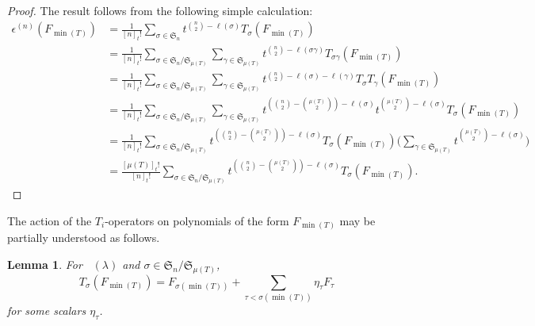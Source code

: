 \documentclass[pdftex]{sigma}
\numberwithin{equation}{section}
\newtheorem{Lemma}[Theorem]{Lemma}
\theoremstyle{definition}
\DeclareMathOperator{\RSSYT}{\mathrm{RSSYT}_{\geq 0}}
\DeclareMathOperator{\Min}{\mathrm{min}}
\begin{document}
\begin{proof}
 The result follows from the following simple calculation:
 \begin{align*}
 \epsilon^{(n)}(F_{\Min(T)}) &
 = \frac{1}{[n]_{t}!}\sum_{\sigma \in \mathfrak{S}_n} t^{{n\choose 2} - \ell(\sigma)} T_{\sigma} (F_{\Min(T)}) \\
 & = \frac{1}{[n]_{t}!}\sum_{\sigma \in \mathfrak{S}_n/\mathfrak{S}_{\mu(T)}} \sum_{\gamma \in \mathfrak{S}_{\mu(T)}} t^{{n\choose 2} - \ell(\sigma\gamma)} T_{\sigma \gamma} (F_{\Min(T)}) \\
 & = \frac{1}{[n]_{t}!}\sum_{\sigma \in \mathfrak{S}_n/\mathfrak{S}_{\mu(T)}} \sum_{\gamma \in \mathfrak{S}_{\mu(T)}} t^{{n\choose 2} - \ell(\sigma) - \ell(\gamma)} T_{\sigma} T_{\gamma} (F_{\Min(T)}) \\
 & = \frac{1}{[n]_{t}!}\sum_{\sigma \in \mathfrak{S}_n/\mathfrak{S}_{\mu(T)}} \sum_{\gamma \in \mathfrak{S}_{\mu(T)}} t^{({n\choose 2}- {\mu(T) \choose 2})- \ell(\sigma)} t^{ {\mu(T) \choose 2} - \ell(\sigma) } T_{\sigma} (F_{\Min(T)}) \\
 & = \frac{1}{[n]_{t}!}\sum_{\sigma \in \mathfrak{S}_n/\mathfrak{S}_{\mu(T)}} t^{({n\choose 2}- {\mu(T) \choose 2})- \ell(\sigma)} T_{\sigma} (F_{\Min(T)}) \biggl( \sum_{\gamma \in \mathfrak{S}_{\mu(T)}}t^{ {\mu(T) \choose 2} - \ell(\sigma) }\biggr) \\
 & = \frac{[\mu(T)]_{t}!}{[n]_{t}!} \sum_{\sigma \in \mathfrak{S}_n/\mathfrak{S}_{\mu(T)}} t^{ ({n \choose 2} - {\mu(T) \choose 2}) - \ell(\sigma)}T_{\sigma}(F_{\Min(T)}).\tag*{\qed}
 \end{align*} \renewcommand{\qed}{}
\end{proof}

The action of the $T_i$-operators on polynomials of the form $F_{\Min(T)}$ may be partially understood as follows.

\begin{Lemma}\label{triangularity for min coset reps}
For $\RSSYT(\lambda)$ and $\sigma \in \mathfrak{S}_n/\mathfrak{S}_{\mu(T)}$,
\[
T_{\sigma}(F_{\Min(T)}) = F_{\sigma(\Min(T))} + \sum_{\tau < \sigma(\Min(T))} \eta_{\tau} F_{\tau}
\]
 for some scalars $\eta_{\tau}$.
\end{Lemma}
\end{document}
